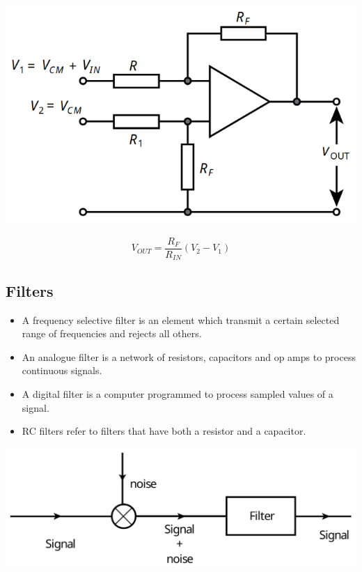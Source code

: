 \documentclass[11pt]{article}
\begin{document}
\begin{center}
\includegraphics[scale=0.8]{./images/differential-amplifier-alt.png}
\end{center}
\[V_{OUT} = \frac{R_F}{R_{IN}} \left(V_2 - V_1 \right)\]
\subsection{Filters}
\label{sec:orgbda6a51}
\begin{itemize}
\item A frequency selective filter is an element which transmit a certain selected range of frequencies and rejects all others.
\item An analogue filter is a network of resistors, capacitors and op amps to process continuous signals.
\item A digital filter is a computer programmed to process sampled values of a signal.
\item RC filters refer to filters that have both a resistor and a capacitor.
\end{itemize}

\begin{center}
\includegraphics[width=.9\linewidth]{./images/filtering-image.png}
\end{center}
\end{document}
